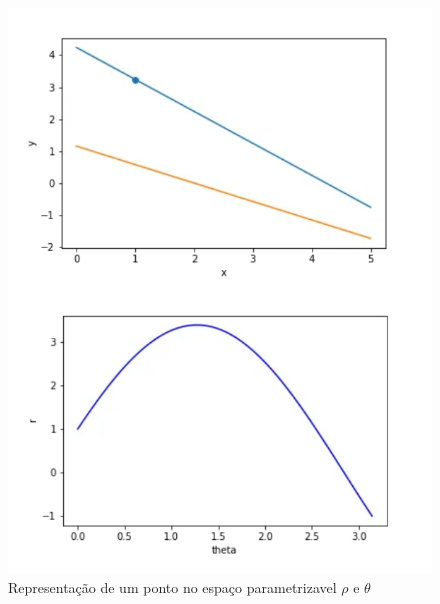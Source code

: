 \newpage
\begin{figure}[!htb]
	\centering
	\includegraphics[scale=0.5]{figuras/math/pontoEspacoParametrizavel.png}
	\caption{Representação de um ponto no espaço parametrizavel $\rho$ e $\theta$}
	\label{fig:Representacao de um ponto no espaco parametrizavel}
\end{figure}

